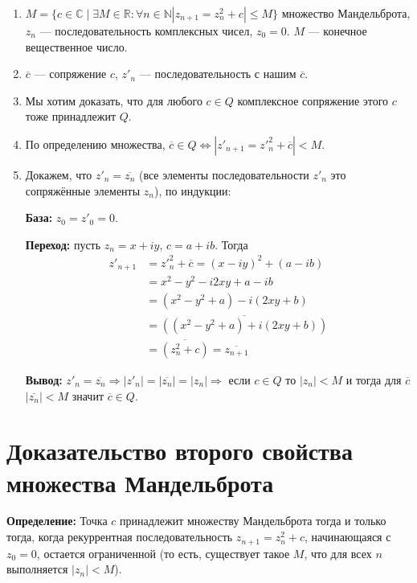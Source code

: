 \documentclass[a4paper,12pt]{article}
\begin{document}
\begin{enumerate}
    \item $M=\{c\in\mathbb{C} \mid \exists M\in\mathbb{R} : \forall n\in\mathbb{N} |z_{n+1}=z_{n}^{2}+c| \le M\}$ множество Мандельброта, $z_{n}$ — последовательность комплексных чисел, $z_{0}=0$. $M$ — конечное вещественное число.
    \item $\overline{c}$ — сопряжение $c$, $z'_{n}$ — последовательность с нашим $\overline{c}$.
    \item Мы хотим доказать, что для любого $c\in Q$ комплексное сопряжение этого $c$ тоже принадлежит $Q$.
    \item По определению множества, $\overline{c}\in Q \Leftrightarrow |z'_{n+1}=z'^{2}_{n}+\overline{c}|<M$.
    \item Докажем, что $z'_{n}=\overline{z_{n}}$ (все элементы последовательности $z'_{n}$ это сопряжённые элементы $z_{n}$), по индукции:
    
    \textbf{База:} $z_{0}=z'_{0}=0$.
    
    \textbf{Переход:} пусть $z_{n}=x+iy$, $c=a+ib$. Тогда
    \begin{align*}
        z'_{n+1} &= z'^{2}_{n}+\overline{c}=(x-iy)^{2}+(a-ib) \\
                         &= x^{2}-y^{2}-i2xy+a-ib \\
                         &= (x^{2}-y^{2}+a)-i(2xy+b) \\
                         &= \overline{((x^{2}-y^{2}+a)+i(2xy+b))} \\
                         &= \overline{(z_{n}^{2}+c)}=\overline{z_{n+1}}
    \end{align*}
    
    \textbf{Вывод:} $z'_{n}=\overline{z_{n}} \Rightarrow |z'_{n}|=|\overline{z_{n}}|=|z_{n}| \Rightarrow$ если $c\in Q$ то $|z_{n}|<M$ и тогда для $\overline{c}$ $|\overline{z_{n}}|<M$ значит $\overline{c}\in Q$.
\end{enumerate}

\clearpage

\hypertarget{sec:3}{}
\section{\textbf{Доказательство второго свойства множества Мандельброта}}

\textbf{Определение:} Точка $c$ принадлежит множеству Мандельброта тогда и только тогда, когда рекуррентная последовательность $z_{n+1}=z_{n}^{2}+c$, начинающаяся с $z_{0}=0$, остается ограниченной (то есть, существует такое $M$, что для всех $n$ выполняется $|z_{n}|<M$).
\end{document}
